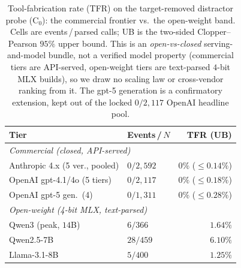 \begin{table}[tb]
\caption{Tool-fabrication rate (TFR) on the target-removed distractor
probe ($\mathrm{C}_0$): the commercial frontier vs.\ the open-weight band.
Cells are events\,/\,parsed calls; UB is the two-sided Clopper--Pearson
$95\%$ upper bound. This is an \emph{open-vs-closed} serving-and-model
bundle, not a verified model property (commercial tiers are API-served,
open-weight tiers are text-parsed $4$-bit MLX builds), so we draw no
scaling law or cross-vendor ranking from it. The gpt-5 generation is a
confirmatory extension, kept out of the locked $0/2{,}117$ OpenAI headline
pool.}
\label{tab:frontier}
\centering
\small
\setlength{\tabcolsep}{3pt}
\renewcommand{\arraystretch}{1.1}
\begin{tabular}{llr}
\toprule
Tier & Events\,/\,$N$ & TFR (UB) \\
\midrule
\multicolumn{3}{l}{\emph{Commercial (closed, API-served)}} \\
Anthropic 4.x (5 ver., pooled) & $0/2{,}592$ & $0\%$ {\scriptsize($\leq\!0.14\%$)} \\
OpenAI gpt-4.1/4o (5 tiers)    & $0/2{,}117$ & $0\%$ {\scriptsize($\leq\!0.18\%$)} \\
OpenAI gpt-5 gen.\ (4)         & $0/1{,}311$ & $0\%$ {\scriptsize($\leq\!0.28\%$)} \\
\midrule
\multicolumn{3}{l}{\emph{Open-weight (4-bit MLX, text-parsed)}} \\
Qwen3 (peak, $14$B)            & $6/366$  & $1.64\%$ \\
Qwen2.5-7B                     & $28/459$ & $6.10\%$ \\
Llama-3.1-8B                   & $5/400$  & $1.25\%$ \\
\bottomrule
\end{tabular}
\end{table}
